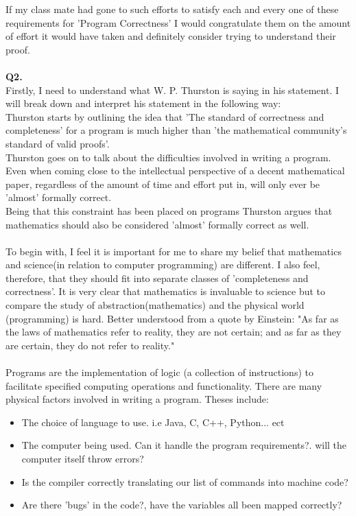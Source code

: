 \documentclass[a4paper,12pt]{article}
\begin{document}
If my class mate had gone to such efforts to satisfy each and every one of these requirements for 'Program Correctness' I would congratulate them on the amount of effort it would have taken and definitely consider trying to understand their proof.\\
\\
\noindent \textbf{Q2.} \\
Firstly, I need to understand what W. P. Thurston is saying in his statement. I will break down and interpret his statement in the following way: \\
Thurston starts by outlining the idea that 'The standard of correctness and completeness' for a program is much higher than 'the mathematical community's standard of valid proofs'.\\
Thurston goes on to talk about the difficulties involved in writing a program. Even when coming close to the intellectual perspective of a decent mathematical paper, regardless of the amount of time and effort put in, will only ever be 'almost' formally correct. \\
Being that this constraint has been placed on programs Thurston argues that mathematics should also be considered 'almost' formally correct as well. \\
\\
To begin with, I feel it is important for me to share my belief that mathematics and science(in relation to computer programming) are different. I also feel, therefore, that they should fit into separate classes of 'completeness and correctness'. It is very clear that mathematics is invaluable to science but to compare the study of abstraction(mathematics) and the physical world (programming) is hard. Better understood from a quote by Einstein: "As far as the laws of mathematics refer to reality, they are not certain; and as far as they are certain, they do not refer to reality."\\
\\
Programs are the implementation of logic (a collection of instructions) to facilitate specified computing operations and functionality. There are many physical factors involved in writing a program. Theses include:
\begin{itemize}
\item The choice of language to use. i.e Java, C, C++, Python... ect
\item The computer being used. Can it handle the program requirements?. will the computer itself throw errors?
\item Is the compiler correctly translating our list of commands into machine code? 
\item Are there 'bugs' in the code?, have the variables all been mapped correctly?
\end{itemize} 
\end{document}
